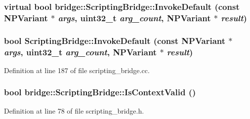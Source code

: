 \hypertarget{classbridge_1_1_scripting_bridge_aec42e4cce5b1ff9187d98b88b07d11d3}{
\subsubsection[{InvokeDefault}]{\setlength{\rightskip}{0pt plus 5cm}virtual bool bridge::ScriptingBridge::InvokeDefault (const NPVariant $\ast$ {\em args}, \/  uint32\_\-t {\em arg\_\-count}, \/  NPVariant $\ast$ {\em result})}}
\label{classbridge_1_1_scripting_bridge_aec42e4cce5b1ff9187d98b88b07d11d3}
\hypertarget{classbridge_1_1_scripting_bridge_a2cee828951db15b4cce1074e934c4f97}{
\subsubsection[{InvokeDefault}]{\setlength{\rightskip}{0pt plus 5cm}bool ScriptingBridge::InvokeDefault (const NPVariant $\ast$ {\em args}, \/  uint32\_\-t {\em arg\_\-count}, \/  NPVariant $\ast$ {\em result})}}
\label{classbridge_1_1_scripting_bridge_a2cee828951db15b4cce1074e934c4f97}


Definition at line 187 of file scripting\_\-bridge.cc.

\hypertarget{classbridge_1_1_scripting_bridge_ad09cd2cdc6df27d2c3f1ae6cda6d6958}{
\subsubsection[{IsContextValid}]{\setlength{\rightskip}{0pt plus 5cm}bool bridge::ScriptingBridge::IsContextValid ()}}
\label{classbridge_1_1_scripting_bridge_ad09cd2cdc6df27d2c3f1ae6cda6d6958}


Definition at line 78 of file scripting\_\-bridge.h.

